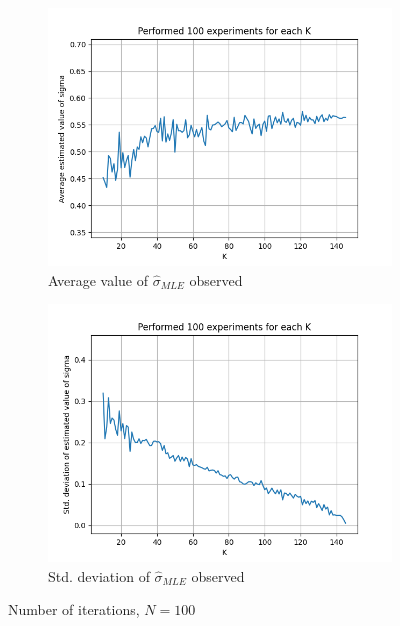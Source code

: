 \documentclass[fleqn, 11pt]{article}
\begin{document}
\vspace{30pt}
\begin{figure}[H]
    \centering
    \begin{subfigure}[H]{0.49\textwidth}
        \centering
        \includegraphics[width=\textwidth]{P1_sigma/avgs_100.png}
        \caption[]{Average value of $\hat{\sigma}_{MLE}$ observed}
    \end{subfigure}
    \begin{subfigure}[H]{0.49\textwidth}
        \centering
        \includegraphics[width=\textwidth]{P1_sigma/stds_100.png}
        \caption[]{Std. deviation of $\hat{\sigma}_{MLE}$ observed}
    \end{subfigure}
    \caption{Number of iterations, $N = 100$}
\end{figure}
\end{document}
